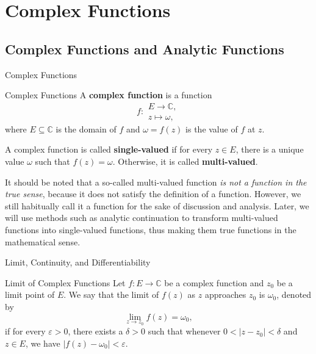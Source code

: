 \chapter{Complex Functions} %
\section{Complex Functions and Analytic Functions} %
\begin{leftbarTitle}{Complex Functions}\end{leftbarTitle}
\begin{definition}{Complex Functions}
    A \textbf{complex function} is a function 
    \[
    f: 
    \begin{matrix}
        E \to \mathbb{C}, \\
        z \mapsto \omega,
    \end{matrix}
    \] 
    where \(E \subseteq \mathbb{C}\) is the domain of \(f\) and \(\omega = f(z)\) is the value of \(f\) at \(z\).
    
    A complex function is called \textbf{single-valued} if 
    for every \(z \in E\), there is a unique value \(\omega\) such that \(f(z) = \omega\).
    Otherwise, it is called \textbf{multi-valued}.
\end{definition}

\begin{caution}
    It should be noted that a so-called multi-valued function \emph{is not a function in the true sense}, 
    because it does not satisfy the definition of a function. 
    However, we still habitually call it a function for the sake of discussion and analysis.
    Later, we will use methods such as analytic continuation to transform multi-valued functions into 
    single-valued functions, thus making them true functions in the mathematical sense.
\end{caution}





\begin{leftbarTitle}{Limit, Continuity, and Differentiability}\end{leftbarTitle}
\begin{definition}{Limit of Complex Functions}
    Let \(f: E \to \mathbb{C}\) be a complex function and \(z_0\) be a limit point of \(E\). 
    We say that the limit of \(f(z)\) as \(z\) approaches \(z_0\) is \(\omega_0\), denoted by
    \[
    \lim_{z \to z_0} f(z) = \omega_0,
    \]
    if for every \(\varepsilon > 0\), there exists a \(\delta > 0\) such that 
    whenever \(0 < |z - z_0| < \delta\) and \(z \in E\), we have \(|f(z) - \omega_0| < \varepsilon\).
\end{definition}

